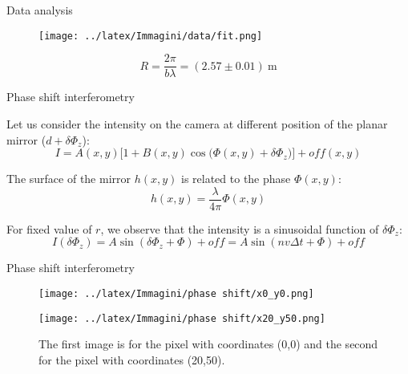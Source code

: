 \documentclass[handout]{beamer}
\theoremstyle{plain}
\theoremstyle{remark}
\theoremstyle{definition}
\begin{document}
  \begin{frame}{Data analysis}
     
    \begin{figure}[h!]
      \centering
      \begin{minipage}{0.8\textwidth}
        \centering
        \texttt{[image: ../latex/Immagini/data/fit.png]}
    \end{minipage}
   
    \end{figure}


    \begin{equation*}
      R=\frac{2\pi}{b\lambda}=(2.57\pm0.01)~\unit{\meter}
    \end{equation*}

  \end{frame}


  \begin{frame}{Phase shift interferometry}

    Let us consider the intensity on the camera at different position of the planar mirror ($d+\delta \Phi_z$):
    \begin{equation*}
      I=A(x,y)\Big[1+B(x,y)\cos \Big(\Phi(x,y)+\delta \Phi_z \Big)\Big]+off(x,y)
    \end{equation*}

  The surface of the mirror $h(x,y)$ is related to the phase $\Phi(x,y)$:
  \begin{equation*}
    h(x,y)=\frac{\lambda}{4\pi} \Phi(x,y)
  \end{equation*}


  For fixed value of $r$, we observe that the intensity is a sinusoidal function of $\delta \Phi_z $:
  \begin{equation*}
    I(\delta \Phi_z )=A \sin(\delta \Phi_z +\Phi)+off=A \sin(n v \Delta t +\Phi)+off
  \end{equation*}

  \end{frame}

  \begin{frame}{Phase shift interferometry}
      \begin{figure}[h!]
        \centering
        \begin{minipage}{0.49\textwidth}
            \centering
            \texttt{[image: ../latex/Immagini/phase shift/x0\_y0.png]}
        \end{minipage}
        \begin{minipage}{0.49\textwidth}
            \centering
            \texttt{[image: ../latex/Immagini/phase shift/x20\_y50.png]}
        \end{minipage}
        \caption{The first image is for the pixel with coordinates (0,0) and the second for the pixel with coordinates (20,50).}
      \end{figure}
            

  \end{frame}
\end{document}
